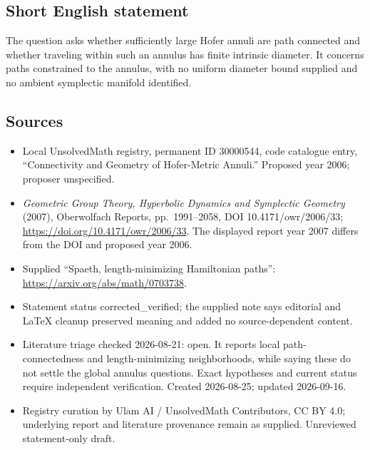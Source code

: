 \documentclass[11pt]{article}
\begin{document}
\subsection{Short English statement}
The question asks whether sufficiently large Hofer annuli are path connected and whether traveling within such an annulus has finite intrinsic diameter. It concerns paths constrained to the annulus, with no uniform diameter bound supplied and no ambient symplectic manifold identified.
\subsection{Sources}
\begin{itemize}
\item Local UnsolvedMath registry, permanent ID 30000544, code catalogue entry, ``Connectivity and Geometry of Hofer-Metric Annuli.'' Proposed year 2006; proposer unspecified.
\item \emph{Geometric Group Theory, Hyperbolic Dynamics and Symplectic Geometry} (2007), Oberwolfach Reports, pp.\ 1991--2058, DOI 10.4171/owr/2006/33; \url{https://doi.org/10.4171/owr/2006/33}. The displayed report year 2007 differs from the DOI and proposed year 2006.
\item Supplied ``Spaeth, length-minimizing Hamiltonian paths'': \url{https://arxiv.org/abs/math/0703738}.
\item Statement status corrected\_verified; the supplied note says editorial and LaTeX cleanup preserved meaning and added no source-dependent content.
\item Literature triage checked 2026-08-21: open. It reports local path-connectedness and length-minimizing neighborhoods, while saying these do not settle the global annulus questions. Exact hypotheses and current status require independent verification. Created 2026-08-25; updated 2026-09-16.
\item Registry curation by Ulam AI / UnsolvedMath Contributors, CC BY 4.0; underlying report and literature provenance remain as supplied. Unreviewed statement-only draft.
\end{itemize}
\end{document}
